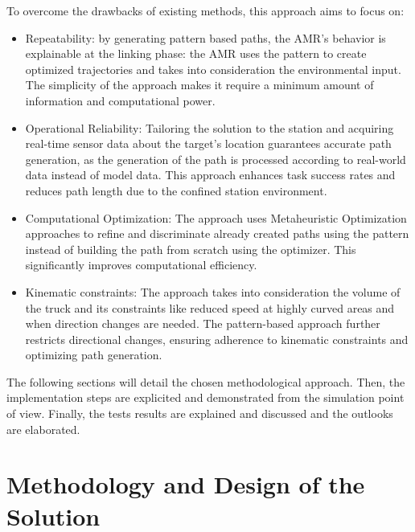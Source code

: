 To overcome the drawbacks of existing methods, this approach aims to focus on:
\begin{itemize}
    \item Repeatability: by generating pattern based paths, the AMR's behavior is explainable at 
    the linking phase: the AMR uses the pattern to create optimized trajectories and takes into 
    consideration the environmental input. The simplicity of the approach makes it require a minimum 
    amount of information and computational power. 
    \item Operational Reliability: Tailoring the solution to the station and acquiring real-time sensor data about
    the target's location guarantees accurate path generation, as the generation of the path is processed 
    according to real-world data instead of model data. 
    This approach enhances task success rates and reduces path length due to the confined station environment.

    \item Computational Optimization: The approach uses Metaheuristic Optimization approaches
    to refine and discriminate already created paths using the pattern instead of building the path 
    from scratch using 
    the optimizer. This significantly improves computational efficiency. 

    \item Kinematic constraints: The approach takes into consideration the volume of the truck and its 
    constraints like reduced speed at highly curved areas and when direction changes are needed. 
    The pattern-based approach further restricts directional changes, ensuring adherence to kinematic 
    constraints and optimizing path generation.
\end{itemize}

The following sections will detail the chosen methodological approach. Then, the implementation steps are 
explicited and demonstrated from the simulation point of view. Finally, the tests results are explained 
and discussed and the outlooks are elaborated. 

\section{Methodology and Design of the Solution}

